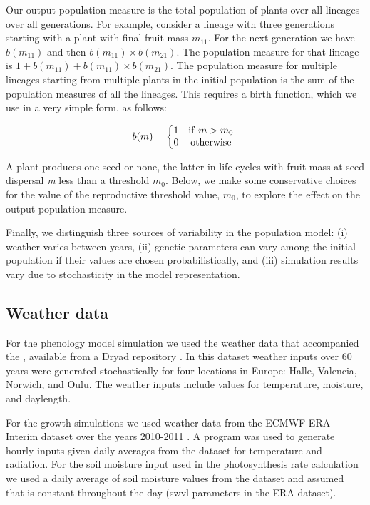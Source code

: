 Our output population measure is the total population of plants over all
lineages over all generations. For example, consider a lineage with
three generations starting with a plant with final fruit mass
\(m_{11}\). For the next generation we have \(b(m_{11})\) and then
\(b(m_{11}) \times b(m_{21})\). The population measure for that lineage
is \(1 + b(m_{11}) + b(m_{11}) \times b(m_{21})\). The population
measure for multiple lineages starting from multiple plants in the
initial population is the sum of the population measures of all the
lineages. This requires a birth function, which we use in a very simple
form, as follows:

\[b( m ) = \left\{ \begin{matrix}
1 & \mathrm{if\ }m > m_{0} \\
0 & \mathrm{otherwise} \\
\end{matrix} \right.\ \]

A plant produces one seed or none, the latter in life cycles with fruit
mass at seed dispersal \emph{m} less than a threshold \(m_{0}\). Below,
we make some conservative choices for the value of the reproductive
threshold value, \(m_{0}\), to explore the effect on the output
population measure.

Finally, we distinguish three sources of variability in the population
model: (i) weather varies between years, (ii) genetic parameters can
vary among the initial population if their values are chosen
probabilistically, and (iii) simulation results vary due to
stochasticity in the model representation.

\subsection{Weather data}
\label{weather-data}

For the phenology model simulation we used the weather data that accompanied the
\citet{burghardt_modeling_2015}, available from a Dryad repository
\citep{burghardt_data_2014}. In this dataset weather inputs over 60 years were
generated stochastically for four locations in Europe: Halle, Valencia, Norwich,
and Oulu. The weather inputs include values for temperature, moisture, and
daylength.

For the growth simulations we used weather data from the ECMWF ERA-Interim
dataset over the years 2010-2011 \citep{dee_era-interim_2011}.  A program was
used to generate hourly inputs given daily averages from the dataset for
temperature and radiation. For the soil moisture input used in the
photosynthesis rate calculation we used a daily average of soil moisture values
from the dataset and assumed that is constant throughout the day (swvl
parameters in the ERA dataset).

